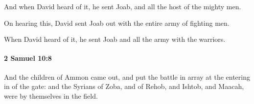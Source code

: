 			\begin{versebox}
					\item[BHS] 
					\item[ASV] And when David heard of it, he sent Joab, and all the host of the mighty men.
					\item[NIV] On hearing this, David sent Joab out with the entire army of fighting men.
					\item[NRSV] When David heard of it, he sent Joab and all the army with the warriors.
			\end{versebox}

		\paragraph{2 Samuel 10:8} %
			\label{2SAMUEL-10-8}

			And the children of Ammon came out, and put the battle in array at the entering in of the gate: and the Syrians of Zoba, and of Rehob, and Ishtob, and Maacah, were by themselves in the field.

